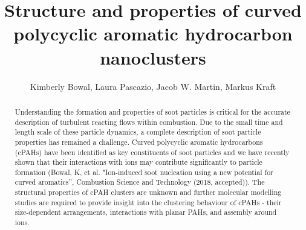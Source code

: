 \documentclass[como,a4paper,12pt,final]{Classes/c4e-preprint}
\begin{document}
\title{Structure and properties of curved polycyclic aromatic hydrocarbon nanoclusters}
\author{Kimberly Bowal, Laura Pascazio, Jacob W. Martin, Markus Kraft}
  

  




\maketitle

\begin{abstract}
Understanding the formation and properties of soot particles is critical for the accurate description of turbulent reacting flows within combustion. Due to the small time and length scale of these particle dynamics, a complete description of soot particle properties has remained a challenge. Curved polycyclic aromatic hydrocarbons (cPAHs) have been identified as key constituents of soot particles and we have recently shown that their interactions with ions may contribute significantly to particle formation (Bowal, K, et al. "Ion-induced soot nucleation using a new potential for curved aromatics'', Combustion Science and Technology (2018, accepted)). The structural properties of cPAH clusters are unknown and further molecular modelling studies are required to provide insight into the clustering behaviour of cPAHs - their size-dependent arrangements, interactions with planar PAHs, and assembly around ions.

\end{abstract}
\end{document}

